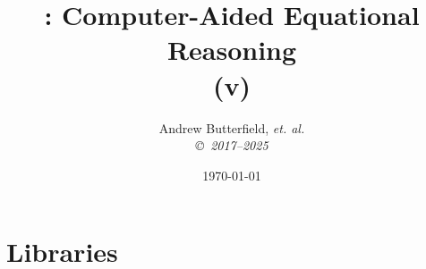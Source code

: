 \documentclass[fleqn,10pt]{report}
\author{
Andrew Butterfield, \it{et. al.}
\\
{\small \copyright\ 2017--2025}
}
\title{
  \reasonEq: Computer-Aided Equational Reasoning
  \\(v\reqVersion)
}
\date{
\today
}
\begin{document}
\maketitle
\setcounter{tocdepth}{2}
\tableofcontents







% 

% 

\part{Libraries}


\newpage
\end{document}
